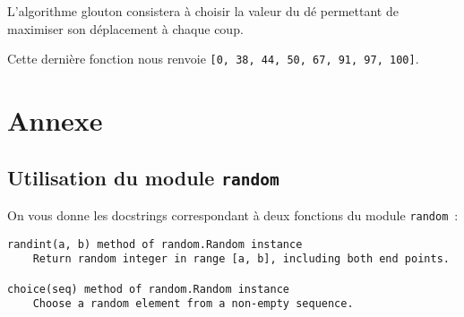 %	



%	


L'algorithme glouton consistera à choisir la valeur du dé permettant de maximiser son déplacement à chaque coup.


%	

Cette dernière fonction nous renvoie \texttt{[0, 38, 44, 50, 67, 91, 97, 100]}. 





\section*{Annexe}

\subsection*{Utilisation du module \texttt{random}}

On vous donne les docstrings correspondant à deux fonctions du module \texttt{random}~: 

\begin{lstlisting}
randint(a, b) method of random.Random instance
    Return random integer in range [a, b], including both end points.
	
choice(seq) method of random.Random instance
    Choose a random element from a non-empty sequence.
\end{lstlisting}

